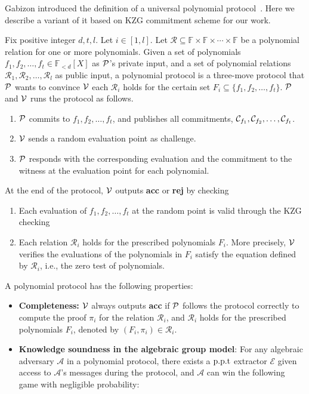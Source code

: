 \hfill \break
Gabizon \etal introduced the definition of a universal polynomial protocol~\cite{plonk}. Here we describe a variant of it based on KZG commitment scheme for our work.
\begin{definition}
Fix positive integer $d,t,l$. Let $i\in[1,l]$. Let $\mathcal{R}\subseteq\mathbb{F}\times\mathbb{F}\times\cdots\times\mathbb{F}$ be a polynomial relation for one or more polynomials. Given a set of polynomials $f_1,f_2,\dots,f_t\in\mathbb{F}_{<d}[X]$ as $\mathcal{P}$'s private input, and a set of polynomial relations $\mathcal{R}_1,\mathcal{R}_2,\dots,\mathcal{R}_l$ as public input, a polynomial protocol is a three-move protocol that $\mathcal{P}$ wants to convince $\mathcal{V}$ each $\mathcal{R}_i$ holds for the certain set $F_i\subseteq\{f_1,f_2,\dots,f_t\}$. $\mathcal{P}$ and $\mathcal{V}$ runs the protocol as follows.
\begin{enumerate}
    \item $\mathcal{P}$ commits to $f_1,f_2,\dots,f_t$, and publishes all commitments, $\mathcal{C}_{f_1},\mathcal{C}_{f_2},\dots,\mathcal{C}_{f_t}$.
    \item $\mathcal{V}$ sends a random evaluation point as challenge.
    \item $\mathcal{P}$ responds with the corresponding evaluation and the commitment to the witness at the evaluation point for each polynomial.
\end{enumerate}
At the end of the protocol, $\mathcal{V}$ outputs \textbf{acc} or \textbf{rej} by checking
\begin{enumerate}
    \item Each evaluation of $f_1,f_2,\dots,f_t$ at the random point is valid through the KZG checking
    \item Each relation $\mathcal{R}_i$ holds for the prescribed polynomials $F_i$. More precisely, $\mathcal{V}$ verifies the evaluations of the polynomials in $F_i$ satisfy the equation defined by $\mathcal{R}_i$, i.e., the zero test of polynomials.
\end{enumerate}
A polynomial protocol has the following properties:
\begin{itemize}
    \item \textbf{Completeness:} $\mathcal{V}$ always outputs \textbf{acc} if $\mathcal{P}$ follows the protocol correctly to compute the proof $\pi_i$ for the relation $\mathcal{R}_i$, and $\mathcal{R}_i$ holds for the prescribed polynomials $F_i$, denoted by $(F_i,\pi_i)\in\mathcal{R}_i$.
    \item \textbf{Knowledge soundness in the algebraic group model}: For any algebraic adversary $\mathcal{A}$ in a polynomial protocol, there exists a $\text{p.p.t}$ extractor $\mathcal{E}$ given access to $\mathcal{A}$'s messages during the protocol, and $\mathcal{A}$ can win the following game with negligible probability:

\end{itemize}
\end{definition}
